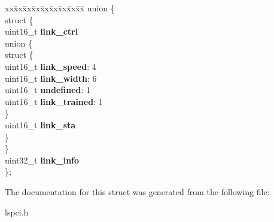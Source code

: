 \begin{DoxyCompactItemize}
\begin{tabbing}
\end{tabbing}\item 
\mbox{\label{structpci_a50137b346b342d2ce39a58d0273ab6cd}} 
\begin{tabbing}
xx\=xx\=xx\=xx\=xx\=xx\=xx\=xx\=xx\=\kill
union \{\\
\mbox{\label{unionpci_1_1_0D15_a981d2ed9425eaf4db7fec65fbd0e979e}} 
\>struct \{\\
\>\>uint16\_t {\bfseries link\_ctrl}\\
\mbox{\label{structpci_1_1_0D15_1_1_0D21_ac356c1dcee4a11e8bbe2b6c28c74aab8}} 
\>\>union \{\\
\mbox{\label{unionpci_1_1_0D15_1_1_0D21_1_1_0D23_a1ae869adfe82220f16d40c4c49673b9e}} 
\>\>\>struct \{\\
\>\>\>\>uint16\_t {\bfseries link\_speed}: 4\\
\>\>\>\>uint16\_t {\bfseries link\_width}: 6\\
\>\>\>\>uint16\_t {\bfseries undefined}: 1\\
\>\>\>\>uint16\_t {\bfseries link\_trained}: 1\\
\>\>\>\} \\
\>\>\>uint16\_t {\bfseries link\_sta}\\
\>\>\} \\
\>\} \\
\>uint32\_t {\bfseries link\_info}\\
\}; \\

\end{tabbing}\end{DoxyCompactItemize}


The documentation for this struct was generated from the following file\+:\begin{DoxyCompactItemize}
\item 
lspci.\+h\end{DoxyCompactItemize}
